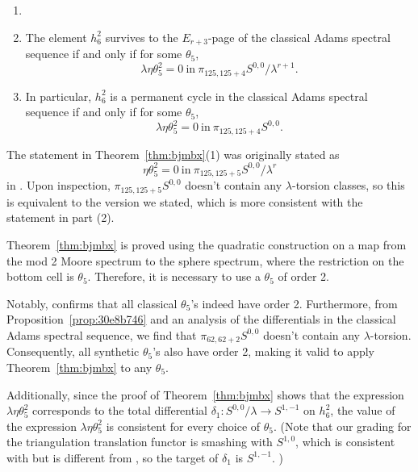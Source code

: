 \documentclass{amsart}
\numberwithin{equation}{section}
\begin{document}
\begin{theorem} \label{thm:bjmbx}
\begin{enumerate}
 \item[]
 \item    The element $h_6^2$ survives to the $E_{r+3}$-page of the classical Adams spectral sequence if and only if for some $\theta_5$, 
 $$\lambda \eta \theta_5^2 = 0 \ \text{in} \ \pi_{125,125+4} S^{0,0}/\lambda^{r+1}.$$
 \item   In particular, $h_6^2$ is a permanent cycle in the classical Adams spectral sequence if and only if for some $\theta_5$,
 $$\lambda \eta \theta_5^2 = 0 \ \text{in} \ \pi_{125,125+4} S^{0,0}.$$ 
 \end{enumerate}
\end{theorem}

\begin{remark}
    The statement in Theorem~\ref{thm:bjmbx}(1) was originally stated as 
    $$\eta \theta_5^2 = 0 \ \text{in} \ \pi_{125,125+5} S^{0,0}/\lambda^r$$
    in \cite[Proposition~7.19]{BurklundXu}. Upon inspection, $\pi_{125,125+5} S^{0,0}$ doesn't contain any $\lambda$-torsion classes, so this is equivalent to the version we stated, which is more consistent with the statement in part (2). 
\end{remark}

\begin{remark} \label{rem:theta5choice}
    Theorem~\ref{thm:bjmbx} is proved using the quadratic construction  on a map from the mod 2 Moore spectrum to the sphere spectrum, where the restriction on the bottom cell is $\theta_5$. Therefore, it is necessary to use a $\theta_5$ of order 2. 
    
    Notably, \cite{Xu, IWX} confirms that all classical $\theta_5$'s indeed have order 2. Furthermore, from Proposition~\ref{prop:30e8b746} and an analysis of the differentials in the classical Adams spectral sequence, we find that $\pi_{62,62+2}S^{0,0}$ doesn't contain any $\lambda$-torsion. Consequently, all synthetic $\theta_5$'s also have order 2, making it valid to apply Theorem~\ref{thm:bjmbx} to any $\theta_5$. 
    
    Additionally, since the proof of Theorem~\ref{thm:bjmbx} shows that the expression $\lambda \eta \theta_5^2$ corresponds to the total differential $\delta_1: S^{0,0}/\lambda \rightarrow S^{1,-1}$ on $h_6^2$, the value of the expression $\lambda \eta \theta_5^2$ is consistent for every choice of $\theta_5$.  (Note that our grading for the triangulation translation functor is smashing with $S^{1,0}$, which is consistent with \cite[Appendix A]{BHS} but is different from \cite[Section 7]{BurklundXu}, so the target of $\delta_1$ is $S^{1,-1}$. )
\end{remark}
\end{document}
